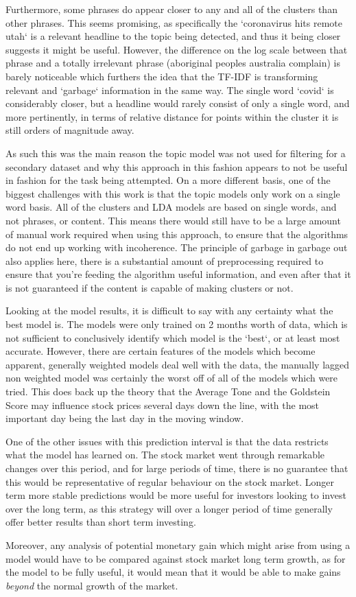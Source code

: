 Furthermore, some phrases do appear closer to any and all of the clusters than other phrases. This seems promising, as specifically the `coronavirus hits remote utah` is a relevant headline to the topic being detected, and thus it being closer suggests it might be useful. However, the difference on the log scale between that phrase and a totally irrelevant phrase (aboriginal peoples australia complain) is barely noticeable which furthers the idea that the TF-IDF is transforming relevant and `garbage` information in the same way. The single word `covid` is considerably closer, but a headline would rarely consist of only a single word, and more pertinently, in terms of relative distance for points within the cluster it is still orders of magnitude away. 

As such this was the main reason the topic model was not used for filtering for a secondary dataset and why this approach in this fashion appears to not be useful in fashion for the task being attempted. On a more different basis, one of the biggest challenges with this work is that the topic models only work on a single word basis. All of the clusters and LDA models are based on single words, and not phrases, or content. This means there would still have to be a large amount of manual work required when using this approach, to ensure that the algorithms do not end up working with incoherence. The principle of garbage in garbage out also applies here, there is a substantial amount of preprocessing required to ensure that you're feeding the algorithm useful information, and even after that it is not guaranteed if the content is capable of making clusters or not.


Looking at the model results, it is difficult to say with any certainty what the best model is. The models were only trained on 2 months worth of data, which is not sufficient to conclusively identify which model is the `best`, or at least most accurate. However, there are certain features of the models which become apparent, generally weighted models deal well with the data, the manually lagged non weighted model was certainly the worst off of all of the models which were tried. This does back up the theory that the Average Tone and the Goldstein Score may influence stock prices several days down the line, with the most important day being the last day in the moving window.

One of the other issues with this prediction interval is that the data restricts what the model has learned on. The stock market went through remarkable changes over this period, and for large periods of time, there is no guarantee that this would be representative of regular behaviour on the stock market. Longer term more stable predictions would be more useful for investors looking to invest over the long term, as this strategy will over a longer period of time generally offer better results than short term investing.

Moreover, any analysis of potential monetary gain which might arise from using a model would have to be compared against stock market long term growth, as for the model to be fully useful, it would mean that it would be able to make gains \textit{beyond} the normal growth of the market.





